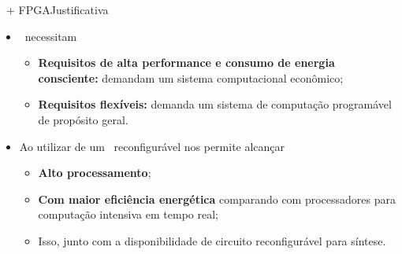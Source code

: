       
      
      \begin{frame}{\Wearable\ + FPGA}{Justificativa  \cite{Plessl2003}} \vspace{-1em}
         \begin{itemize}
            \setlength{\itemsep}{1.6em}
            \item \Wearables\ necessitam
            \begin{itemize}
               \setlength{\itemsep}{1.0em}
               
               \item \textbf{Requisitos de alta performance e consumo de energia consciente:} demandam um sistema computacional econômico;
               
               \item \textbf{Requisitos flexíveis:} demanda um sistema de computação programável de propósito geral.
            \end{itemize}
         
            \item Ao utilizar de um \hardware\ reconfigurável nos permite alcançar
            \begin{itemize}
                \setlength{\itemsep}{1.0em}
               \item \textbf{Alto processamento};
               \item \textbf{Com maior eficiência energética} comparando com processadores para computação intensiva em tempo real;
               \item Isso, junto com a disponibilidade de circuito reconfigurável para síntese.
            \end{itemize}
         \end{itemize}
      \end{frame}
